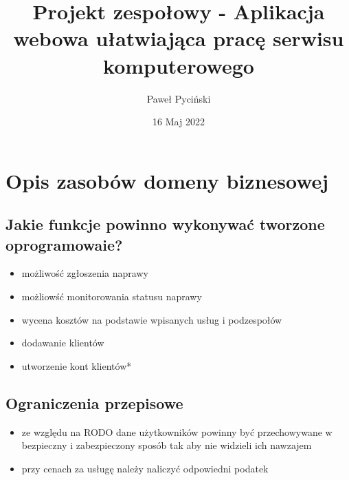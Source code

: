 \documentclass{article}
\title{Projekt zespołowy - Aplikacja webowa ułatwiająca pracę serwisu komputerowego}
\author{Paweł Pyciński }
\date{16 Maj 2022}
\begin{document}
\maketitle
\setcounter{tocdepth}{2}
\tableofcontents
\newpage
\section{Opis zasobów domeny biznesowej}
\subsection{Jakie funkcje powinno wykonywać tworzone oprogramowaie?}
\begin{itemize}
    \item możliwość zgłoszenia naprawy
    \item możliowść monitorowania statusu naprawy
    \item wycena kosztów na podstawie wpisanych usług i podzespołów
    \item dodawanie klientów
    \item utworzenie kont klientów*
\end{itemize}


\subsection{Ograniczenia przepisowe}
\begin{itemize}
    \item ze względu na RODO dane użytkowników powinny być przechowywane w bezpieczny i zabezpieczony sposób tak aby nie widzieli ich nawzajem
    \item przy cenach za usługę należy naliczyć odpowiedni podatek
\end{itemize}
\end{document}

